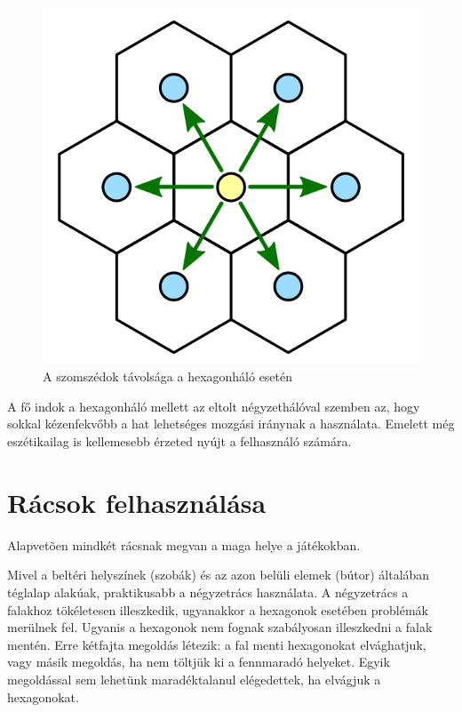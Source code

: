 \begin{figure}[h]
\centering
\includegraphics[scale=0.2]{kepek/img23.png}
\caption{A szomszédok távolsága a hexagonháló esetén}
\label{fig:img23}
\end{figure}

\noindent A fő indok a hexagonháló mellett az eltolt négyzethálóval szemben az, hogy sokkal kézenfekvőbb a hat lehetséges mozgási iránynak a használata. Emelett még eszétikailag is kellemesebb érzeted nyújt a felhasználó számára.

\section{Rácsok felhasználása}

Alapvetõen mindkét rácsnak megvan a maga helye a játékokban. 

Mivel a beltéri helyszínek (szobák) és az azon belüli elemek (bútor) általában téglalap alakúak, praktikusabb a négyzetrács használata. A négyzetrács a falakhoz tökéletesen illeszkedik, ugyanakkor a hexagonok esetében problémák merülnek fel. Ugyanis a hexagonok nem fognak szabályosan illeszkedni a falak mentén. Erre kétfajta megoldás létezik: a fal menti hexagonokat elvághatjuk, vagy másik megoldás, ha nem töltjük ki a fennmaradó helyeket. Egyik megoldással sem lehetünk maradéktalanul elégedettek, ha elvágjuk a hexagonokat. 
\newline

